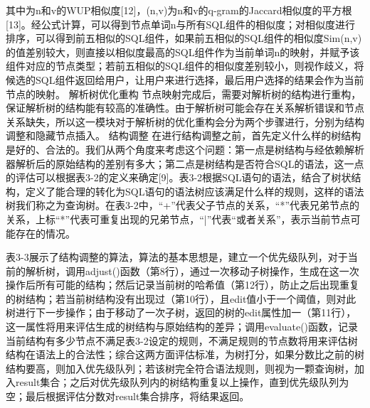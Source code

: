 其中为n和v的WUP相似度[12]，(n,v)为n和v的q-gram的Jaccard相似度的平方根[13]。经公式计算，可以得到节点单词n与所有SQL组件的相似度；对相似度进行排序，可以得到前五相似的SQL组件，如果前五相似的SQL组件的相似度Sim(n,v)的值差别较大，则直接以相似度最高的SQL组件作为当前单词n的映射，并赋予该组件对应的节点类型；若前五相似的SQL组件的相似度差别较小，则视作歧义，将候选的SQL组件返回给用户，让用户来进行选择，最后用户选择的结果会作为当前节点的映射。 
解析树优化重构
节点映射完成后，需要对解析树的结构进行重构，保证解析树的结构能有较高的准确性。由于解析树可能会存在关系解析错误和节点关系缺失，所以这一模块对于解析树的优化重构会分为两个步骤进行，分别为结构调整和隐藏节点插入。
结构调整
在进行结构调整之前，首先定义什么样的树结构是好的、合法的。我们从两个角度来考虑这个问题：第一点是树结构与经依赖解析器解析后的原始结构的差别有多大；第二点是树结构是否符合SQL的语法，这一点的评估可以根据表3-2的定义来确定[9]。表3-2根据SQL语句的语法，结合了树状结构，定义了能合理的转化为SQL语句的语法树应该满足什么样的规则，这样的语法树我们称之为查询树。在表3-2中，“+”代表父子节点的关系，“*”代表兄弟节点的关系，上标“*”代表可重复出现的兄弟节点，“|”代表“或者关系”，表示当前节点可能存在的情况。

表3-3展示了结构调整的算法，算法的基本思想是，建立一个优先级队列，对于当前的解析树，调用adjust()函数（第8行），通过一次移动子树操作，生成在这一次操作后所有可能的结构；然后记录当前树的哈希值（第12行），防止之后出现重复的树结构；若当前树结构没有出现过（第10行），且edit值小于一个阈值，则对此树进行下一步操作；由于移动了一次子树，返回的树的edit属性加一（第11行），这一属性将用来评估生成的树结构与原始结构的差异；调用evaluate()函数，记录当前结构有多少节点不满足表3-2设定的规则，不满足规则的节点数将用来评估树结构在语法上的合法性；综合这两方面评估标准，为树打分，如果分数比之前的树结构要高，则加入优先级队列；若该树完全符合语法规则，则视为一颗查询树，加入result集合；之后对优先级队列内的树结构重复以上操作，直到优先级队列为空；最后根据评估分数对result集合排序，将结果返回。

